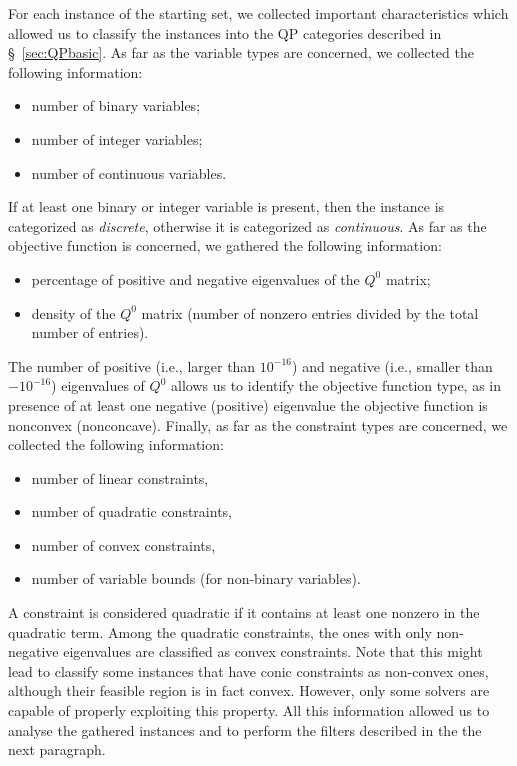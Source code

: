 For each instance of the starting set, we collected important characteristics
which allowed us to classify the instances into the QP categories described in
\S~\ref{sec:QPbasic}. As far as the variable types are concerned, we
collected the following information:
%
\begin{itemize}
 \item number of binary variables; %
 \item number of integer variables; %
 \item number of continuous variables. %
\end{itemize}
%
If at least one binary or integer variable is present, then the instance is
categorized as \emph{discrete}, otherwise it is categorized as \emph{continuous}.
As far as the objective function is concerned, we gathered the following
information:
%
\begin{itemize}
 \item percentage of positive and negative eigenvalues of the $Q^0$ matrix;
 \item density of the $Q^0$ matrix (number of nonzero entries divided by the total
       number of entries). %
\end{itemize}
%

The number of positive (i.e., larger than $10^{-16}$) and negative (i.e., smaller than $-10^{-16}$) eigenvalues of $Q^0$ allows us to identify the
objective function type, as in presence of at least one negative (positive) eigenvalue
the objective function is nonconvex (nonconcave). Finally, as far as the constraint types
are concerned, we collected the following information:
%
\begin{itemize}
 \item number of linear constraints, %
 \item number of quadratic constraints, %
 \item number of convex constraints, %
 \item number of variable bounds (for non-binary variables). %
\end{itemize}
%
A constraint is considered quadratic if it contains at least one nonzero in
the quadratic term. Among the quadratic constraints, the ones with only
non-negative eigenvalues are classified as convex constraints.
Note that this might lead to classify some instances that have conic constraints as non-convex ones, although their feasible region is in fact convex. However, only some solvers are capable of properly exploiting this property.
 All this information allowed us to analyse the gathered instances and to perform the
filters described in the the next paragraph.

